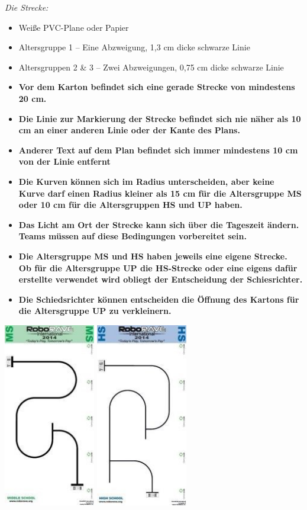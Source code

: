 \documentclass[a4paper,12pt]{article}
\begin{document}
\emph{Die Strecke:}
\begin{itemize}
	\item Weiße PVC-Plane oder Papier
	\item Altersgruppe 1 – Eine Abzweigung, 1,3 cm dicke schwarze Linie
	\item Altersgruppen 2 \& 3 – Zwei Abzweigungen, 0,75 cm dicke schwarze Linie
	\item \textbf{Vor dem Karton befindet sich eine gerade Strecke von mindestens 20 cm.}
	\item \textbf{Die Linie zur Markierung der Strecke befindet sich nie näher als 10 cm
	an einer anderen Linie oder der Kante des Plans.}
	\item \textbf{Anderer Text auf dem Plan befindet sich immer mindestens 10 cm von der Linie
	entfernt}
	\item \textbf{Die Kurven können sich im Radius unterscheiden, aber keine Kurve darf einen
	Radius kleiner als 15 cm für die Altersgruppe MS oder 10 cm für die Altersgruppen HS und UP haben.}
	\item \textbf{Das Licht am Ort der Strecke kann sich über die Tageszeit ändern. Teams müssen
	auf diese Bedingungen vorbereitet sein.}
	\item \textbf{Die Altersgruppe MS und HS haben jeweils eine eigene Strecke. Ob für die
	Altersgruppe UP die HS-Strecke oder eine eigens dafür erstellte verwendet wird obliegt der
	Entscheidung der Schiesrichter.}
	\item \textbf{ Die Schiedsrichter können entscheiden die Öffnung des Kartons für die
	Altersgruppe UP zu verkleinern.}
\end{itemize}
\includegraphics[width=0.3\textwidth]{track_ms_lf.png}
\includegraphics[width=0.3\textwidth]{track_hs_lf.png}
\end{document}

